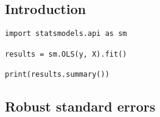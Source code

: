 
\subsection{Introduction}

\begin{verbatim}
import statsmodels.api as sm

results = sm.OLS(y, X).fit()

print(results.summary())
\end{verbatim}

\subsection{Robust standard errors}
